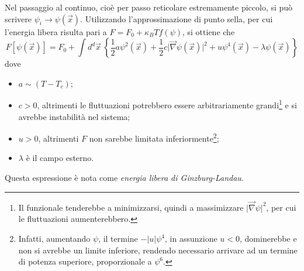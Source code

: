 \documentclass[11pt, a4paper]{scrartcl}
\theoremstyle{style}
\theoremstyle{style1}
\numberwithin{equation}{subsection}
\begin{document}
Nel passaggio al continuo, cio\`e per passo reticolare estremamente piccolo, si pu\`o scrivere $\psi _i \longrightarrow \psi (\vec{x})$. 
Utilizzando l'approssimazione di punto sella, per cui l'energia libera risulta pari a $F = F_0 + \kappa _B T f(\psi )$, si ottiene che 
\[
	F[\psi (\vec{x})] = F_0 +  \int d^d \vec{x} \ \left\{ \frac{1}{2} a \psi ^2 (\vec{x}) + \frac{1}{2} c \lvert \vec{\nabla }\psi (\vec{x}) \rvert^2 + u \psi ^4 (\vec{x}) - \lambda \psi (\vec{x})  \right\} 
\] 
dove 
\begin{itemize}
	\item $a\sim (T-T_c)$;
\item $c>0$, altrimenti le fluttuazioni potrebbero essere arbitrariamente grandi\footnote{Il funzionale tenderebbe a minimizzarsi, quindi a massimizzare $\lvert \vec{\nabla }\psi  \rvert^2$, per cui le fluttuazioni aumenterebbero.} e si avrebbe instabilit\`a nel sistema;
	\item $u > 0$, altrimenti $F$ non sarebbe limitata inferiormente\footnote{Infatti, aumentando $\psi $, il termine $- \lvert u \rvert \psi ^4$, in assunzione $u<0$, dominerebbe e non si avrebbe un limite inferiore, rendendo necessario arrivare ad un termine di potenza superiore, proporzionale a $\psi ^6$.};
	\item $\lambda $ \`e il campo esterno.
\end{itemize}
Questa espressione \`e nota come \textit{energia libera di Ginzburg-Landau.} 
\end{document}
